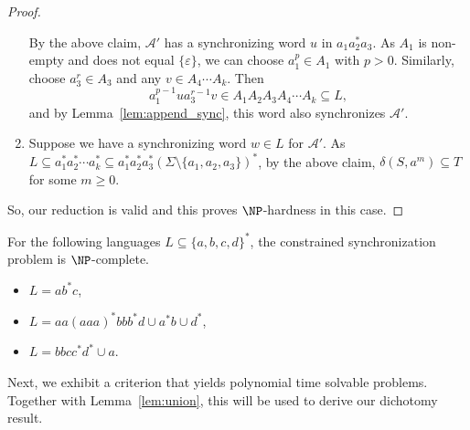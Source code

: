 \begin{proof}
\begin{enumerate}
 By the above claim, $\mathcal A'$ 
 has a synchronizing word $u$ in $a_1 a_2^* a_3$.
 As $A_1$ is non-empty
 and does not equal $\{\varepsilon\}$, we can choose $a_1^p \in A_1$ with $p > 0$.
 Similarly, choose $a_3^r \in A_3$ and any $v \in A_4 \cdots A_k$.
 Then
 \[
  a_1^{p-1} u a_3^{r-1} v \in A_1 A_2 A_3 A_4 \cdots A_k \subseteq L,
 \]
 and by Lemma~\ref{lem:append_sync}, this word also synchronizes $\mathcal A'$.

\item Suppose we have a synchronizing word $w \in L$
 for $\mathcal A'$.
 As $L \subseteq a_1^* a_2^* \cdots a_k^* \subseteq a_1^* a_2^* a_3^* (\Sigma \setminus\{a_1,a_2,a_3\})^*$,
 by the above claim,
 $\delta(S, a^m) \subseteq T$
 for some $m \ge 0$.
\end{enumerate}
So, our reduction is valid and this proves $\NP$-hardness
in this case.
\end{proof}

 
\begin{example}
 For the following languages $L \subseteq \{a,b,c,d\}^*$, the 
 constrained synchronization problem
 is $\NP$-complete.
 \begin{itemize}
 \item $L = ab^*c$,
 \item $L = aa(aaa)^*bbb^*d \cup a^*b \cup d^*$,
 \item $L = bbcc^*d^* \cup a$.
 \end{itemize}
 \end{example}
 
 Next, we exhibit a criterion that yields polynomial time solvable 
 problems.
 Together with Lemma~\ref{lem:union}, this will be
 used to derive our dichotomy result.
 
